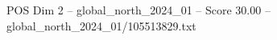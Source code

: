 \begin{textsample}{POS Dim 2 – global\_north\_2024\_01 – Score 30.00 – global\_north\_2024\_01/105513829.txt}
\end{textsample}
